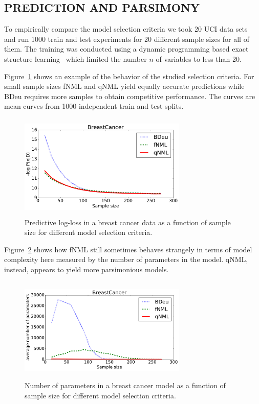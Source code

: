 \subsection{PREDICTION AND PARSIMONY}

To empirically compare the model selection criteria we took 20 UCI
data sets~\cite{Lichman:2013} and run 1000 train and test experiments
for 20 different sample sizes for all of them. The training was
conducted using a dynamic programming based exact structure
learning~\cite{cosco.uai06} which limited the number $n$ of variables
to less than 20.

Figure~\ref{fig:bcmean} shows an example of the behavior of the
studied selection criteria.  For small sample sizes fNML and qNML
yield equally accurate predictions while BDeu requires more samples to
obtain competitive performance. The curves are mean curves from 1000
independent train and test splits.

\begin{figure}
\centering
\includegraphics[width=8cm,height=5cm]{breast_cancer_mean.pdf}
\caption{Predictive log-loss in a breast cancer data as a function of
  sample size for different model selection criteria.}
\label{fig:bcmean}
\end{figure}

Figure~\ref{fig:bcnpmean} shows how fNML still sometimes behaves
strangely in terms of model complexity here measured by the number of
parameters in the model.  qNML, instead, appears to yield more
parsimonious models.

\begin{figure}
\centering
\includegraphics[width=8cm,height=5cm]{breast_cancer_np_mean.pdf}
\caption{Number of parameters in a breast cancer model as a function
  of sample size for different model selection criteria.}
\label{fig:bcnpmean}
\end{figure}

